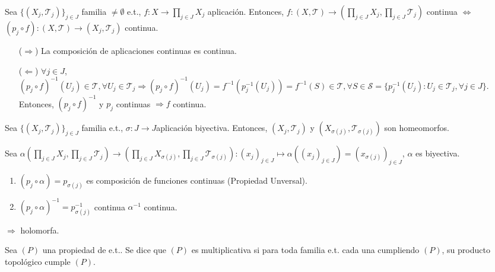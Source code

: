 \begin{prop}
  Sea $\{ ( X_{j}, \mathcal{T}_{j} ) \}_{j \in J}$ familia $\neq \emptyset$ e.t., $f: X \to \prod_{j \in J} X_{j}$ aplicación. Entonces, $f: ( X, \mathcal{T} ) \to ( \prod_{j \in J} X_{j}, \prod_{j \in J} \mathcal{T}_{j} )$ continua $\Leftrightarrow$ $(p_{j} \circ f): ( X, \mathcal{T} ) \to ( X_{j}, \mathcal{T}_{j} )$ continua.
\end{prop}

\begin{dem}
  \begin{enumerate}[label=(\roman*)]
    \item [($\Rightarrow$)] La composición de aplicaciones continuas es continua.
    \item [($\Leftarrow$)] $\forall j \in J$, $(p_{j} \circ f)^{-1}(U_{j}) \in \mathcal{T}, \forall U_{j} \in \mathcal{T}_{j} \Rightarrow (p_{j} \circ f)^{-1}(U_{j}) = f^{-1}(p_{j}^{-1}(U_{j})) = f^{-1}(S) \in \mathcal{T}, \forall S \in \mathcal{S} = \{ p_{j}^{-1}(U_{j}) : U_{j} \in \mathcal{T}_{j}, \forall j \in J \}$. Entonces, $(p_{j} \circ f)^{-1}$ y $p_{j}$ continuas $\Rightarrow f$ continua.
  \end{enumerate}
\end{dem}

\begin{prop}
  Sea $\{ ( X_{j}, \mathcal{T}_{j} ) \}_{j \in J}$ familia e.t., $\sigma: J \to J$aplicación biyectiva. Entonces, $( X_{j}, \mathcal{T}_{j} )$ y $( X_{\sigma(j)}, \mathcal{T}_{\sigma(j)} )$ son homeomorfos.
\end{prop}

\begin{dem}
  Sea $\alpha ( \prod_{j \in J} X_{j}, \prod_{j \in J} \mathcal{T}_{j} ) \to ( \prod_{j \in J} X_{\sigma(j)}, \prod_{j \in J} \mathcal{T}_{\sigma(j)} ): ( x_{j} )_{j \in J} \mapsto \alpha(( x_{j} )_{j \in J}) = ( x_{\sigma(j)} )_{j \in J}$, $\alpha$ es biyectiva.
  \begin{enumerate}[label=(\roman*)]
    \item $(p_{j} \circ \alpha) = p_{\sigma(j)}$ es composición de funciones continuas (Propiedad Unversal).
    \item $(p_{j} \circ \alpha)^{-1} = p_{\sigma(j)}^{-1}$ continua $\alpha^{-1}$ continua.
  \end{enumerate}
  $\Rightarrow$ holomorfa.
\end{dem}

\begin{defn}
  Sea $(P)$ una propiedad de e.t.. Se dice que $(P)$ es multiplicativa si para toda familia e.t. cada una cumpliendo $(P)$, su producto topológico cumple $(P)$.
\end{defn}

